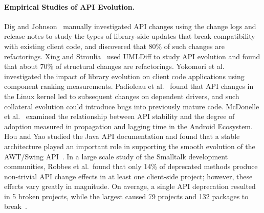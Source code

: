\paragraph{{Empirical Studies of API Evolution.}}
Dig and Johnson~\cite{Dig'05} manually investigated API changes using the change logs and release notes to study the types of library-side updates that break compatibility with existing client code, and discovered that 80\% of such changes are refactorings. Xing and Stroulia~\cite{Xing2006:apievol} used UMLDiff to study API evolution and found that about 70\% of structural changes are refactorings. 
Yokomori et al.~\cite{Yokomori2009:apiimpact} investigated the impact of library evolution on client code applications using component ranking measurements. Padioleau et al.~\cite{Padioleau2006:collateral} found that API changes in the Linux kernel led to subsequent changes on dependent drivers, and such collateral evolution could introduce bugs into previously mature code. McDonelle et al.~\cite{McDonnell2013:api} examined the relationship between API stability and the degree of adoption measured in propagation and lagging time in the Android Ecosystem. Hou and Yao studied the Java API documentation and found that a stable architecture played an important role in supporting the smooth evolution of the AWT/Swing API~\cite{Hou2011:api}. In a large scale study of the Smalltalk development communities, Robbes et al.~found that only 14\% of deprecated methods produce non-trivial API change effects in at least one client-side project; however, these effects vary greatly in magnitude. On average, a single API deprecation resulted in 5 broken projects, while the largest caused 79 projects and 132 packages to break~\cite{robbes2012}.

